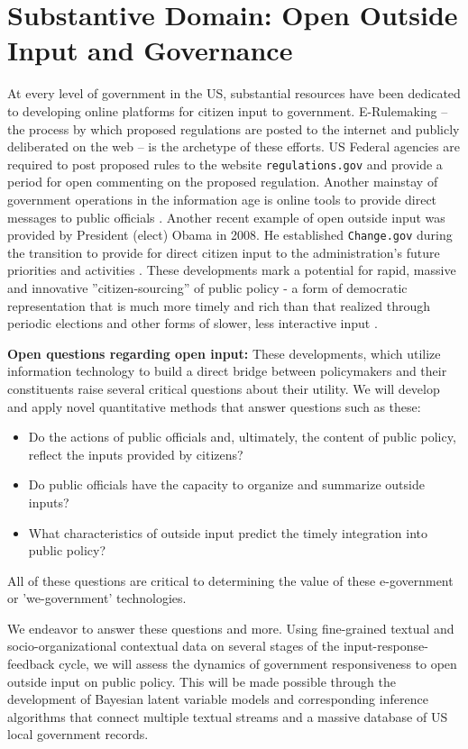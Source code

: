 \section{Substantive Domain: Open Outside Input and Governance}

At every level of government in the US, substantial resources have been dedicated to developing online platforms for citizen input to government. E-Rulemaking \cite{Coglianese2004} -- the process by which proposed regulations are posted to the internet and publicly deliberated on the web -- is the archetype of these efforts. US Federal agencies are required to post proposed rules to the website \texttt{regulations.gov} and provide a period for open commenting on the proposed regulation. Another mainstay of government operations in the information age is online tools to provide direct messages to public officials \cite{Balla2007}. Another recent example of open outside input was provided by President (elect) Obama in 2008. He established \texttt{Change.gov} during the transition to provide for direct citizen input to the administration's future priorities and activities \cite{Borins2009}. These developments mark a potential for rapid, massive and innovative ''citizen-sourcing'' of public policy - a form of democratic representation that is much more timely and rich than that realized through periodic elections and other forms of slower, less interactive input  \cite{Linders2012}.

{\bf Open questions regarding open input:} These developments, which utilize information technology to build a direct bridge between policymakers and their constituents raise several critical questions about their utility. We will develop and apply novel quantitative methods that answer questions such as these:
\begin{itemize}
\item Do the actions of public officials and, ultimately, the content of public policy, reflect the inputs provided by citizens?
\item Do public officials have the capacity to organize and summarize outside inputs?
\item What characteristics of outside input predict the timely integration into public policy?
\end{itemize} All of these questions are critical to determining the value of these e-government or 'we-government' technologies.


We endeavor to answer these questions and more. Using fine-grained textual and socio-organizational contextual data on several stages of the input-response-feedback cycle, we will assess the dynamics of government responsiveness to open outside input on public policy. This will be made possible through the development of Bayesian latent variable models and corresponding inference algorithms that connect multiple textual streams and a massive database of US local government records.


